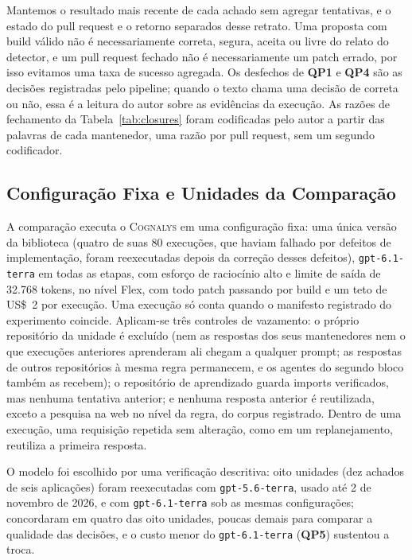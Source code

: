 \documentclass[conference]{IEEEtran}
\newcommand{\system}{\textsc{Cognalys}}
\newcommand{\researchq}[1]{\textbf{QP#1}}
\begin{document}
Mantemos o resultado mais recente de cada achado sem agregar tentativas, e o estado do pull request
e o retorno separados desse retrato. Uma proposta com build válido não é
necessariamente correta, segura, aceita ou livre do relato do detector, e um pull
request fechado não é necessariamente um patch errado, por isso
evitamos uma taxa de sucesso agregada. Os desfechos de \researchq{1} e \researchq{4} são as decisões
registradas pelo pipeline; quando o texto chama uma decisão de correta ou não,
essa é a leitura do autor sobre as evidências da execução. As razões de
fechamento da Tabela~\ref{tab:closures} foram codificadas pelo autor a partir das
palavras de cada mantenedor, uma razão por pull request, sem um segundo
codificador.

\subsection{Configuração Fixa e Unidades da Comparação}
\label{subsec:frozen}

A comparação executa o {\system} em uma configuração fixa: uma única versão da biblioteca
(quatro de suas 80 execuções, que haviam falhado por defeitos de
implementação, foram reexecutadas depois da correção desses defeitos), \texttt{gpt-6.1-terra} em todas as etapas, com esforço de raciocínio
alto e limite de saída de 32.768 tokens, no nível Flex, com todo patch
passando por build e um teto de US\$~2 por execução. Uma execução só conta quando o manifesto
registrado do experimento coincide. Aplicam-se três controles de vazamento: o próprio
repositório da unidade é excluído (nem as respostas dos seus mantenedores nem o que execuções
anteriores aprenderam ali chegam a qualquer prompt; as respostas de outros repositórios à
mesma regra permanecem, e os agentes do segundo bloco também as recebem); o
repositório de aprendizado guarda imports verificados, mas nenhuma tentativa anterior; e
nenhuma resposta anterior é reutilizada, exceto a pesquisa na web no nível da regra, do
corpus registrado. Dentro de uma execução, uma requisição repetida sem alteração, como
em um replanejamento, reutiliza a primeira resposta.

O modelo foi escolhido por uma verificação descritiva: oito unidades (dez achados de
seis aplicações) foram reexecutadas com \texttt{gpt-5.6-terra}, usado até
2 de novembro de 2026, e com \texttt{gpt-6.1-terra}
sob as mesmas configurações; concordaram em quatro das oito unidades, poucas
demais para comparar a qualidade das decisões, e o custo menor do
\texttt{gpt-6.1-terra} (\researchq{5}) sustentou a troca.
\end{document}
